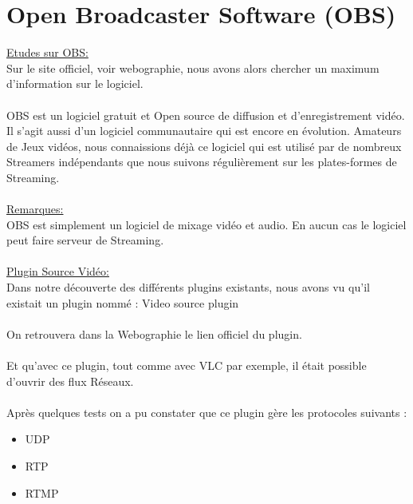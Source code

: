 \documentclass{report}
\begin{document}
    \section{Open Broadcaster Software (OBS)} 
    
    \underline{Etudes sur OBS:}\\
    
    Sur le site officiel, voir webographie, nous avons alors chercher un maximum d’information sur le logiciel.
    \\
    \\
    OBS est un logiciel gratuit et Open source de diffusion et d'enregistrement vidéo. Il s'agit aussi d'un logiciel communautaire qui est encore en évolution. Amateurs de Jeux vidéos, nous connaissions déjà ce logiciel qui est utilisé par de nombreux Streamers indépendants que nous suivons régulièrement sur les plates-formes de Streaming.\\

    \\
    \underline{Remarques:}\\
    
    OBS est simplement un logiciel de mixage vidéo et audio. En aucun cas le logiciel peut faire serveur de Streaming.\\

    \\
    \underline{Plugin Source Vidéo:}\\
    
    
    Dans notre découverte des différents plugins existants, nous avons vu qu’il existait un plugin nommé : Video source plugin
    \\
    \\
    On retrouvera dans la Webographie le lien officiel du plugin.
    \\
    \\
    Et qu’avec ce plugin, tout comme avec VLC par exemple, il était possible d’ouvrir des flux Réseaux.
    \\
    \\
    Après quelques tests on a pu constater que ce plugin gère les protocoles suivants :
    \\


    \begin{itemize}
    \item UDP
    \item RTP
    \item RTMP
    \end{itemize}
\end{document}
